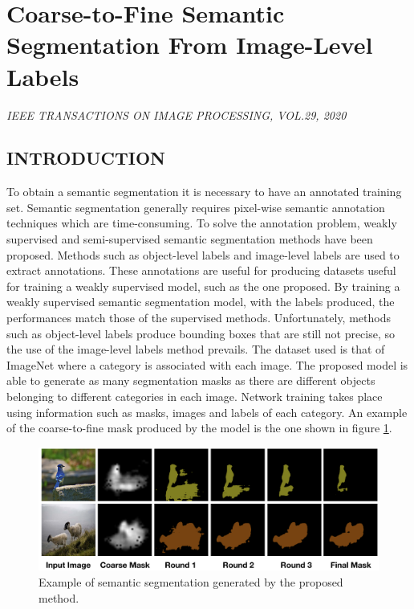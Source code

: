 \section{Coarse-to-Fine Semantic Segmentation From Image-Level Labels}

\begin{flushleft}
    \author{
    Longlong Jing,
    Yucheng Chen,
    Yingli Tan,
    \emph{Fellow, IEEE}
    }
\end{flushleft}

\begin{center}
    \emph{IEEE TRANSACTIONS ON IMAGE PROCESSING, VOL.29, 2020}
\end{center}

\subsection{INTRODUCTION}
To obtain a semantic segmentation it is necessary to have an annotated 
training set. Semantic segmentation generally requires pixel-wise semantic 
annotation techniques which are time-consuming. To solve the annotation 
problem, weakly supervised and semi-supervised semantic segmentation 
methods have been proposed. Methods such as object-level labels and image-level 
labels are used to extract annotations. These annotations are useful for 
producing datasets useful for training a weakly supervised model, such as 
the one proposed. By training a weakly supervised semantic segmentation 
model, with the labels produced, the performances match those of the supervised 
methods. Unfortunately, methods such as object-level labels produce 
bounding boxes that are still not precise, so the use of the image-level labels 
method prevails. The dataset used is that of ImageNet where a category is 
associated with each image. The proposed model is able to generate as many 
segmentation masks as there are different objects belonging to different 
categories in each image. Network training takes place using information such as 
masks, images and labels of each category. An example of the coarse-to-fine 
mask produced by the model is the one shown in figure \ref{fig:semanticWork}.
\begin{figure}[htbp]
    \centering
    \includegraphics[width = 1 \linewidth]{images/paper6/work.png}
    \centering
    \caption{Example of semantic segmentation generated by the proposed method.}
    \label{fig:semanticWork}
\end{figure}